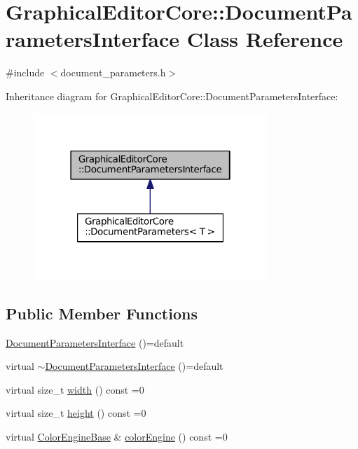 \hypertarget{classGraphicalEditorCore_1_1DocumentParametersInterface}{}\section{Graphical\+Editor\+Core\+:\+:Document\+Parameters\+Interface Class Reference}
\label{classGraphicalEditorCore_1_1DocumentParametersInterface}


{\ttfamily \#include $<$document\+\_\+parameters.\+h$>$}



Inheritance diagram for Graphical\+Editor\+Core\+:\+:Document\+Parameters\+Interface\+:
\nopagebreak
\begin{figure}[H]
\begin{center}
\leavevmode
\includegraphics[width=250pt]{classGraphicalEditorCore_1_1DocumentParametersInterface__inherit__graph}
\end{center}
\end{figure}
\subsection*{Public Member Functions}
\begin{DoxyCompactItemize}
\item 
\hyperlink{classGraphicalEditorCore_1_1DocumentParametersInterface_aea8d5f5d01c0046d0bc2adad22487b23}{Document\+Parameters\+Interface} ()=default
\item 
virtual \hyperlink{classGraphicalEditorCore_1_1DocumentParametersInterface_a17f379e6cde775c74283e90d046372e4}{$\sim$\+Document\+Parameters\+Interface} ()=default
\item 
virtual size\+\_\+t \hyperlink{classGraphicalEditorCore_1_1DocumentParametersInterface_a8e96d1aa50d0b2bd3ef21fafaeaa4261}{width} () const =0
\item 
virtual size\+\_\+t \hyperlink{classGraphicalEditorCore_1_1DocumentParametersInterface_a1a3f45e27f2c9b11d04b2fe562323bb2}{height} () const =0
\item 
virtual \hyperlink{classGraphicalEditorCore_1_1ColorEngineBase}{Color\+Engine\+Base} \& \hyperlink{classGraphicalEditorCore_1_1DocumentParametersInterface_aa686512ed2fc7bc504c1ee97ac8e4ad6}{color\+Engine} () const =0
\end{DoxyCompactItemize}


